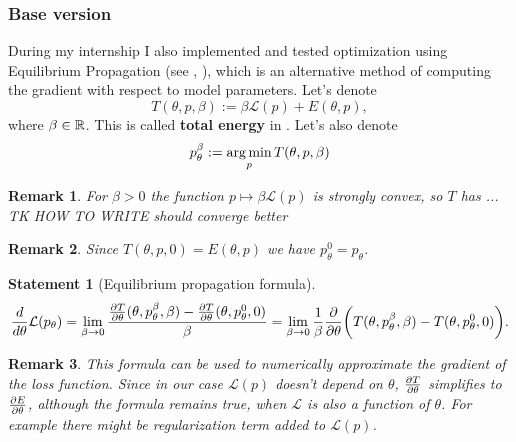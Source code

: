 \documentclass[a4paper,10pt]{report}
\newtheorem{statement}{Statement}
\newtheorem{remark}{Remark}
\begin{document}
\subsubsection{Base version}
During my internship I also implemented and tested optimization using Equilibrium Propagation (see \cite{eqprop}, \cite{zucchet2022beyond}), which is an alternative method of computing the gradient with respect to model parameters.
Let's denote
\begin{equation}
T(\theta, p, \beta) := \beta \mathcal{L}(p) + E(\theta, p),
\end{equation}
where $\beta \in \mathbb{R}$.
 This is called \textbf{total energy} in \cite{eqprop}. Let's also denote
\begin{equation}
p_{\theta}^{\beta}:=\operatorname*{arg\,min}_p T(\theta, p, \beta)
\end{equation}
\begin{remark}
 For $\beta>0$ the function $p \mapsto \beta \mathcal{L}(p)$ is strongly convex, so $T$ has ... TK HOW TO WRITE should converge better
 \end{remark}
 \begin{remark}
   Since $T(\theta,p,0) = E(\theta,p)$ we have $p_{\theta}^{0}=p_{\theta}$.
 \end{remark}


\begin{statement}[Equilibrium propagation formula]
 \begin{equation}
 \frac{d}{d\theta} \mathcal{L}(p_\theta) = \lim_{\beta \to 0} \frac{\frac{\partial T}{\partial \theta}(\theta, p_\theta^\beta, \beta)-\frac{\partial T}{\partial \theta}(\theta, p_\theta^0, 0) }{\beta} = \lim_{\beta \to 0}\frac{1}{\beta} \frac{\partial }{\partial \theta} \bigg(T(\theta, p_\theta^\beta,\beta) - T(\theta, p_\theta^0, 0)\bigg).
\end{equation}
\end{statement}
\begin{remark}

This formula can be used to numerically approximate the gradient of the loss function.
Since in our case $\mathcal{L}(p)$ doesn't depend on $\theta$, $\frac{\partial T}{\partial \theta}$ simplifies to $\frac{\partial E}{\partial \theta}$, although the formula remains true, when $\mathcal{L}$ is also a function of $\theta$. For example there might be regularization term added to $\mathcal{L}(p)$.
\end{remark}
\end{document}
